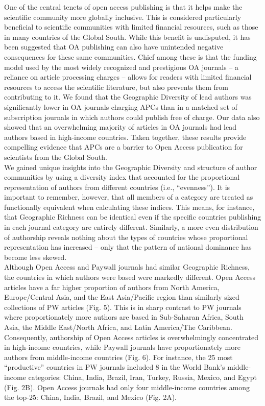 \documentclass[
  english,
  man]{apa6}
\begin{document}
One of the central tenets of open access publishing is that it helps make the scientific community more globally inclusive. This is considered particularly beneficial to scientific communities with limited financial resources, such as those in many countries of the Global South. While this benefit is undisputed, it has been suggested that OA publishing can also have unintended negative consequences for these same communities. Chief among these is that the funding model used by the most widely recognized and prestigious OA journals -- a reliance on article processing charges -- allows for readers with limited financial resources to access the scientific literature, but also prevents them from contributing to it. We found that the Geographic Diversity of lead authors was significantly lower in OA journals charging APCs than in a matched set of subscription journals in which authors could publish free of charge. Our data also showed that an overwhelming majority of articles in OA journals had lead authors based in high-income countries. Taken together, these results provide compelling evidence that APCs are a barrier to Open Access publication for scientists from the Global South.\\
We gained unique insights into the Geographic Diversity and structure of author communities by using a diversity index that accounted for the proportional representation of authors from different countries (i.e., \enquote{evenness}). It is important to remember, however, that all members of a category are treated as functionally equivalent when calculating these indices. This means, for instance, that Geographic Richness can be identical even if the specific countries publishing in each journal category are entirely different. Similarly, a more even distribution of authorship reveals nothing about the types of countries whose proportional representation has increased -- only that the pattern of national dominance has become less skewed.\\
Although Open Access and Paywall journals had similar Geographic Richness, the countries in which authors were based were markedly different. Open Access articles have a far higher proportion of authors from North America, Europe/Central Asia, and the East Asia/Pacific region than similarly sized collections of PW articles (Fig. 5). This is in sharp contrast to PW journals where proportionately more authors are based in Sub-Saharan Africa, South Asia, the Middle East/North Africa, and Latin America/The Caribbean. Consequently, authorship of Open Access articles is overwhelmingly concentrated in high-income countries, while Paywall journals have proportionately more authors from middle-income countries (Fig. 6). For instance, the 25 most \enquote{productive} countries in PW journals included 8 in the World Bank's middle-income categories: China, India, Brazil, Iran, Turkey, Russia, Mexico, and Egypt (Fig. 2B). Open Access journals had only four middle-income countries among the top-25: China, India, Brazil, and Mexico (Fig. 2A).\\
\end{document}
